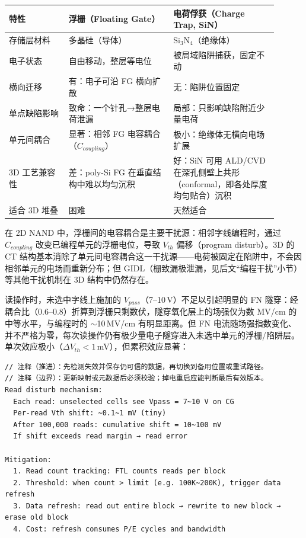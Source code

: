 \begin{longtable}{L{0.2\linewidth}L{0.35\linewidth}L{0.35\linewidth}}
\toprule
特性 & 浮栅（Floating Gate） & 电荷俘获（Charge Trap, SiN） \\
\midrule
存储层材料 & 多晶硅（导体） & Si$_3$N$_4$（绝缘体） \\\tablerowrule
电子状态 & 自由移动，整层等电位 & 被局域陷阱捕获，固定不动 \\\tablerowrule
横向迁移 & 有：电子可沿 FG 横向扩散 & 无：陷阱位置固定 \\\tablerowrule
单点缺陷影响 & 致命：一个针孔→整层电荷泄漏 & 局部：只影响缺陷附近少量电荷 \\\tablerowrule
单元间耦合 & 显著：相邻 FG 电容耦合（$C_{coupling}$） & 极小：绝缘体无横向电场扩展 \\\tablerowrule
3D 工艺兼容性 & 差：poly-Si FG 在垂直结构中难以均匀沉积 & 好：SiN 可用 ALD/CVD 在深孔侧壁上共形（conformal，即各处厚度均匀贴合）沉积 \\\tablerowrule
适合 3D 堆叠 & 困难 & 天然适合 \\
\bottomrule
\end{longtable}

在 2D NAND 中，浮栅间的电容耦合是主要干扰源：相邻字线编程时，通过 $C_{coupling}$ 改变已编程单元的浮栅电位，导致 $V_{th}$ 偏移（program disturb）。3D 的 CT 结构基本消除了单元间电容耦合这一干扰源——电荷被固定在陷阱中，不会因相邻单元的电场而重新分布；但 GIDL（栅致漏极泄漏，见后文“编程干扰”小节）等其他干扰机制在 3D 结构中仍然存在。


读操作时，未选中字线上施加的 $V_{pass}$（7--10\,V）不足以引起明显的 FN 隧穿：经耦合比（0.6--0.8）折算到浮栅只剩数伏，隧穿氧化层上的场强仅为数 MV/cm 的中等水平，与编程时的 $\sim$10\,MV/cm 有明显距离。但 FN 电流随场强指数变化、并不严格为零，每次读操作仍有极少量电子隧穿进入未选中单元的浮栅/陷阱层。单次效应极小（$\Delta V_{th} < 1$\,mV），但累积效应显著：

\begin{lstlisting}
// 注释（推进）：先检测失效并保存仍可信的数据，再切换到备用位置或重试路径。
// 注释（边界）：更新映射或元数据后必须校验；掉电重启应能判断最后有效版本。
Read disturb mechanism:
  Each read: unselected cells see Vpass = 7~10 V on CG
  Per-read Vth shift: ~0.1~1 mV (tiny)
  After 100,000 reads: cumulative shift = 10~100 mV
  If shift exceeds read margin → read error

Mitigation:
  1. Read count tracking: FTL counts reads per block
  2. Threshold: when count > limit (e.g. 100K~200K), trigger data refresh
  3. Data refresh: read out entire block → rewrite to new block → erase old block
  4. Cost: refresh consumes P/E cycles and bandwidth
\end{lstlisting}


